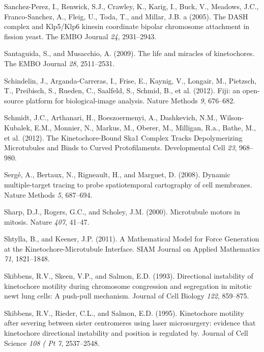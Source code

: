 \documentclass[12pt,a4paper,twoside,openright]{book}
\begin{document}
\hypertarget{ref-Sanchez-Perez2005}{}
Sanchez-Perez, I., Renwick, S.J., Crawley, K., Karig, I., Buck, V.,
Meadows, J.C., Franco-Sanchez, A., Fleig, U., Toda, T., and Millar, J.B.
a (2005). The DASH complex and Klp5/Klp6 kinesin coordinate bipolar
chromosome attachment in fission yeast. The EMBO Journal \emph{24},
2931--2943.

\hypertarget{ref-Santaguida2009a}{}
Santaguida, S., and Musacchio, A. (2009). The life and miracles of
kinetochores. The EMBO Journal \emph{28}, 2511--2531.

\hypertarget{ref-Schindelin2012}{}
Schindelin, J., Arganda-Carreras, I., Frise, E., Kaynig, V., Longair,
M., Pietzsch, T., Preibisch, S., Rueden, C., Saalfeld, S., Schmid, B.,
et al. (2012). Fiji: an open-source platform for biological-image
analysis. Nature Methods \emph{9}, 676--682.

\hypertarget{ref-Schmidt2012}{}
Schmidt, J.C., Arthanari, H., Boeszoermenyi, A., Dashkevich, N.M.,
Wilson-Kubalek, E.M., Monnier, N., Markus, M., Oberer, M., Milligan,
R.a., Bathe, M., et al. (2012). The Kinetochore-Bound Ska1 Complex
Tracks Depolymerizing Microtubules and Binds to Curved Protofilaments.
Developmental Cell \emph{23}, 968--980.

\hypertarget{ref-Serge2008}{}
Sergé, A., Bertaux, N., Rigneault, H., and Marguet, D. (2008). Dynamic
multiple-target tracing to probe spatiotemporal cartography of cell
membranes. Nature Methods \emph{5}, 687--694.

\hypertarget{ref-Sharp2000}{}
Sharp, D.J., Rogers, G.C., and Scholey, J.M. (2000). Microtubule motors
in mitosis. Nature \emph{407}, 41--47.

\hypertarget{ref-Shtylla2011}{}
Shtylla, B., and Keener, J.P. (2011). A Mathematical Model for Force
Generation at the Kinetochore-Microtubule Interface. SIAM Journal on
Applied Mathematics \emph{71}, 1821--1848.

\hypertarget{ref-Skibbens1993}{}
Skibbens, R.V., Skeen, V.P., and Salmon, E.D. (1993). Directional
instability of kinetochore motility during chromosome congression and
segregation in mitotic newt lung cells: A push-pull mechanism. Journal
of Cell Biology \emph{122}, 859--875.

\hypertarget{ref-Skibbens1995}{}
Skibbens, R.V., Rieder, C.L., and Salmon, E.D. (1995). Kinetochore
motility after severing between sister centromeres using laser
microsurgery: evidence that kinetochore directional instability and
position is regulated by. Journal of Cell Science \emph{108 ( Pt 7},
2537--2548.
\end{document}
